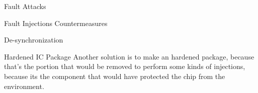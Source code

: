\begin{chapter}{Fault Attacks}
\begin{section}{Fault Injections Countermeasures}
\begin{subsection}{De-synchronization}
      \end{subsection}
      \begin{subsection}{Hardened IC Package}
        Another solution is to make an hardened package, because that's the portion that would be
        removed to perform some kinds of injections, because its the component that would have
        protected the chip from the environment.

      \end{subsection}
    \end{section}

  \end{chapter}

